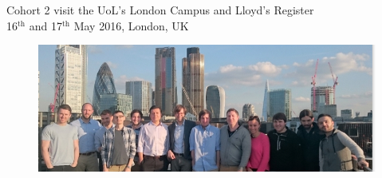 \documentclass[11pt]{article}%
\begin{document}
\cleardoublepage

\thispagestyle{Training}

\begin{minipage}{1.\textwidth}
\vspace{20pt}
{\LARGE {Cohort 2 visit the UoL's London Campus and Lloyd's Register}}\\ {\large 16$^{\text{th}}$ and 17$^{\text{th}}$ May 2016, London, UK}
\end{minipage}

\begin{minipage}{1.\textwidth}
\begin{figure}[H]
\centering
\includegraphics[width=0.9\linewidth]{training/LGroupPicture_2.jpg}\\
\end{figure}
\end{minipage}


\end{document}
